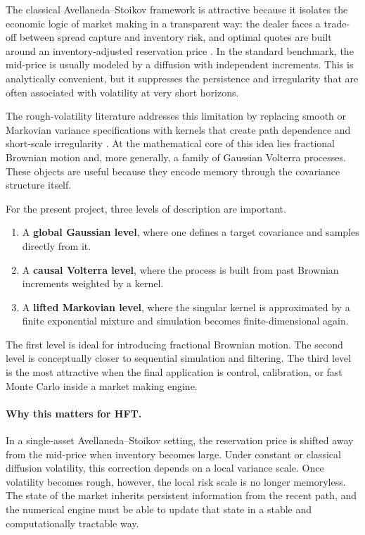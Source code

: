 \documentclass[a4paper,10pt,titlepage,oneside,openany]{book}
\theoremstyle{plain}
\theoremstyle{definition}
\theoremstyle{remark}
\newcommand{\1}{\mathbf{1}}
\begin{document}
The classical Avellaneda--Stoikov framework is attractive because it isolates the economic logic of market making in a transparent way: the dealer faces a trade-off between spread capture and inventory risk, and optimal quotes are built around an inventory-adjusted reservation price \cite{AvellanedaStoikov2008}. In the standard benchmark, the mid-price is usually modeled by a diffusion with independent increments. This is analytically convenient, but it suppresses the persistence and irregularity that are often associated with volatility at very short horizons.

The rough-volatility literature addresses this limitation by replacing smooth or Markovian variance specifications with kernels that create path dependence and short-scale irregularity \cite{GatheralJaissonRosenbaum2018,ElEuchRosenbaum2019}. At the mathematical core of this idea lies fractional Brownian motion and, more generally, a family of Gaussian Volterra processes. These objects are useful because they encode memory through the covariance structure itself.

For the present project, three levels of description are important.

\begin{enumerate}[label=\arabic*.]
    \item A \textbf{global Gaussian level}, where one defines a target covariance and samples directly from it.
    \item A \textbf{causal Volterra level}, where the process is built from past Brownian increments weighted by a kernel.
    \item A \textbf{lifted Markovian level}, where the singular kernel is approximated by a finite exponential mixture and simulation becomes finite-dimensional again.
\end{enumerate}

The first level is ideal for introducing fractional Brownian motion. The second level is conceptually closer to sequential simulation and filtering. The third level is the most attractive when the final application is control, calibration, or fast Monte Carlo inside a market making engine.

\paragraph{Why this matters for HFT.}
In a single-asset Avellaneda--Stoikov setting, the reservation price is shifted away from the mid-price when inventory becomes large. Under constant or classical diffusion volatility, this correction depends on a local variance scale. Once volatility becomes rough, however, the local risk scale is no longer memoryless. The state of the market inherits persistent information from the recent path, and the numerical engine must be able to update that state in a stable and computationally tractable way.
\end{document}
